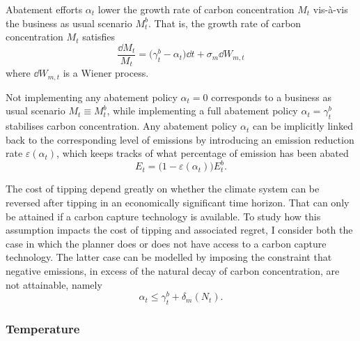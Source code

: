 \documentclass[../../main.tex]{subfiles}
\begin{document}
Abatement efforts $\alpha_t$ lower the growth rate of carbon concentration $M_t$ vis-à-vis the business as usual scenario $M^b_t$. That is, the growth rate of carbon concentration $M_t$ satisfies \begin{equation} \label{eq:dynamics:carbon-concentration}
    \frac{\dd{M}_t}{M_t} = \big(\gamma^b_t - \alpha_t \big) \dd{t} + \sigma_m \dd{W}_{m, t}
\end{equation} where $\dd{W}_{m, t}$ is a Wiener process. 

Not implementing any abatement policy $\alpha_t = 0$ corresponds to a business as usual scenario $M_t \equiv M^b_t$, while implementing a full abatement policy $\alpha_t = \gamma^b_t$ stabilises carbon concentration. Any abatement policy $\alpha_t$ can be implicitly linked back to the corresponding level of emissions by introducing an emission reduction rate $\varepsilon(\alpha_t)$, which keeps tracks of what percentage of emission has been abated \begin{equation} \label{eq:emissivity}
    E_t = \big(1 - \varepsilon(\alpha_t)\big) E^b_t.
\end{equation}

The cost of tipping depend greatly on whether the climate system can be reversed after tipping in an economically significant time horizon. That can only be attained if a carbon capture technology is available. To study how this assumption impacts the cost of tipping and associated regret, I consider both the case in which the planner does or does not have access to a carbon capture technology. The latter case can be modelled by imposing the constraint that negative emissions, in excess of the natural decay of carbon concentration, are not attainable, namely \begin{equation}
    \alpha_t \leq \gamma^b_t + \delta_m(N_t).
\end{equation} 

\subsubsection{Temperature}
\end{document}
